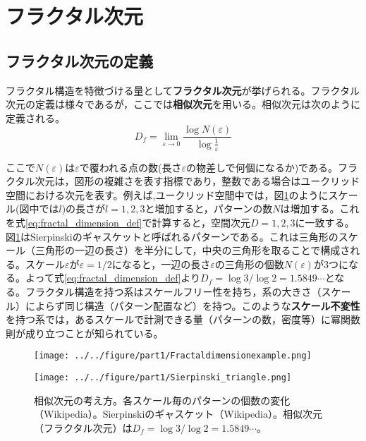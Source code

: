 \documentclass[autodetect-engine,dvi=dvipdfmx,a4paper,ja=standard,oneside,openany,11pt]{bxjsbook}
\begin{document}
\section{フラクタル次元}
\label{sec:fractal_dimension}
\subsection{フラクタル次元の定義}
フラクタル構造を特徴づける量として\textbf{フラクタル次元}が挙げられる。フラクタル次元の定義は様々であるが，ここでは\textbf{相似次元}を用いる。相似次元は次のように定義される。
\begin{equation}
  D_f=\lim_{\varepsilon \to 0}\frac{\log N(\varepsilon)}{\log \frac{1}{\varepsilon}}
  \label{eq:fractal_dimension_def}
\end{equation}

ここで$N(\varepsilon)$は$\varepsilon$で覆われる点の数(長さ$\varepsilon$の物差しで何個になるか)である。フラクタル次元は，図形の複雑さを表す指標であり，整数である場合はユークリッド空間における次元を表す。例えば,ユークリッド空間中では，図\ref{fig:fractal_stracture}のようにスケール(図中では$l$)の長さが$l=1,2,3$と増加すると，パターンの数$N$は増加する。これを式\eqref{eq:fractal_dimension_def}で計算すると，空間次元$D=1,2,3$に一致する。図\ref{fig:fractal_stracture}はSierpinskiのギャスケットと呼ばれるパターンである。これは三角形のスケール（三角形の一辺の長さ）を半分にして，中央の三角形を取ることで構成される。スケール$\varepsilon$が$\varepsilon=1/2$になると，一辺の長さ$\varepsilon$の三角形の個数$N(\varepsilon)$が3つになる。よって式\eqref{eq:fractal_dimension_def}より$D_f=\log 3/\log 2=1.5849\cdots$となる。フラクタル構造を持つ系はスケールフリー性を持ち，系の大きさ（スケール）によらず同じ構造（パターン配置など）を持つ。このような\textbf{スケール不変性}を持つ系では，あるスケールで計測できる量（パターンの数，密度等）に冪関数則が成り立つことが知られている。

\begin{figure}[htbp]
  \begin{minipage}{0.45\textwidth}
    \centering
    \subcaption{}
    \texttt{[image: ../../figure/part1/Fractaldimensionexample.png]}
    \label{fig:相似次元の考え方}
  \end{minipage}
  \begin{minipage}{0.45\textwidth}
    \centering
    \subcaption{}
    \texttt{[image: ../../figure/part1/Sierpinski\_triangle.png]}
    \label{fig:シェルピンスキーのギャスケット}
  \end{minipage}
  \caption{相似次元の考え方。各スケール毎のパターンの個数の変化（Wikipedia）。Sierpinskiのギャスケット（Wikipedia）。相似次元（フラクタル次元）は$D_f=\log 3/\log 2=1.5849\cdots$。}
  \label{fig:fractal_stracture}
\end{figure}
\end{document}
